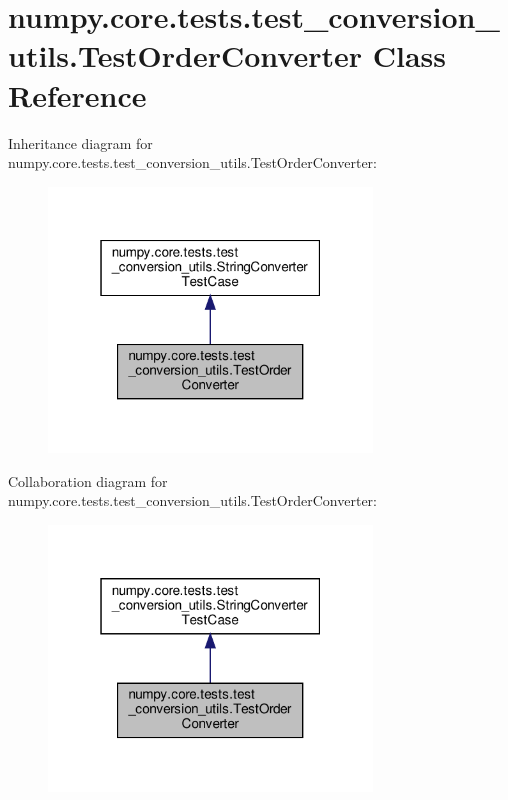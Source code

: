 \hypertarget{classnumpy_1_1core_1_1tests_1_1test__conversion__utils_1_1TestOrderConverter}{}\section{numpy.\+core.\+tests.\+test\+\_\+conversion\+\_\+utils.\+Test\+Order\+Converter Class Reference}
\label{classnumpy_1_1core_1_1tests_1_1test__conversion__utils_1_1TestOrderConverter}


Inheritance diagram for numpy.\+core.\+tests.\+test\+\_\+conversion\+\_\+utils.\+Test\+Order\+Converter\+:
\nopagebreak
\begin{figure}[H]
\begin{center}
\leavevmode
\includegraphics[width=244pt]{classnumpy_1_1core_1_1tests_1_1test__conversion__utils_1_1TestOrderConverter__inherit__graph}
\end{center}
\end{figure}


Collaboration diagram for numpy.\+core.\+tests.\+test\+\_\+conversion\+\_\+utils.\+Test\+Order\+Converter\+:
\nopagebreak
\begin{figure}[H]
\begin{center}
\leavevmode
\includegraphics[width=244pt]{classnumpy_1_1core_1_1tests_1_1test__conversion__utils_1_1TestOrderConverter__coll__graph}
\end{center}
\end{figure}

